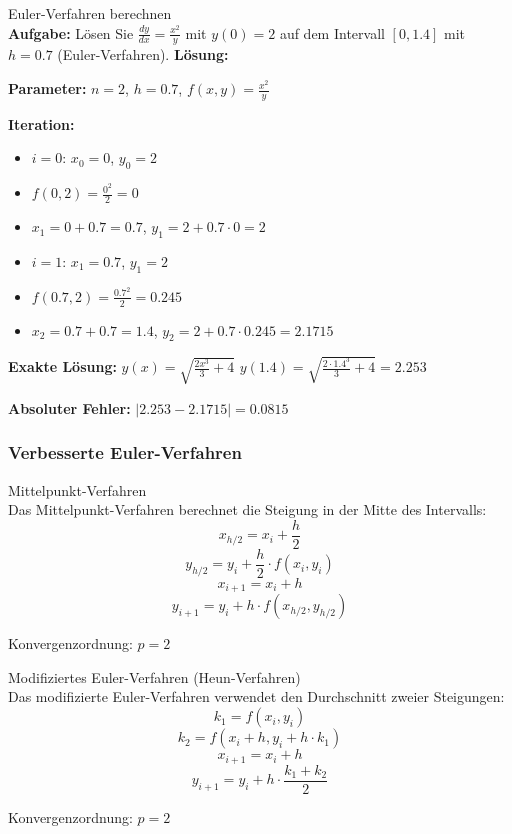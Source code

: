 \begin{example2}{Euler-Verfahren berechnen}\\
\textbf{Aufgabe:} Lösen Sie $\frac{dy}{dx} = \frac{x^2}{y}$ mit $y(0) = 2$ auf dem Intervall $[0, 1.4]$ mit $h = 0.7$ (Euler-Verfahren).
\tcblower
\textbf{Lösung:}

\textbf{Parameter:} $n = 2$, $h = 0.7$, $f(x,y) = \frac{x^2}{y}$

\textbf{Iteration:}
\begin{itemize}
    \item $i = 0$: $x_0 = 0$, $y_0 = 2$
    \item $f(0, 2) = \frac{0^2}{2} = 0$
    \item $x_1 = 0 + 0.7 = 0.7$, $y_1 = 2 + 0.7 \cdot 0 = 2$
\end{itemize}

\begin{itemize}
    \item $i = 1$: $x_1 = 0.7$, $y_1 = 2$
    \item $f(0.7, 2) = \frac{0.7^2}{2} = 0.245$
    \item $x_2 = 0.7 + 0.7 = 1.4$, $y_2 = 2 + 0.7 \cdot 0.245 = 2.1715$
\end{itemize}

\textbf{Exakte Lösung:} $y(x) = \sqrt{\frac{2x^3}{3} + 4}$
$y(1.4) = \sqrt{\frac{2 \cdot 1.4^3}{3} + 4} = 2.253$

\textbf{Absoluter Fehler:} $|2.253 - 2.1715| = 0.0815$
\end{example2}

\subsubsection{Verbesserte Euler-Verfahren}

\begin{theorem}{Mittelpunkt-Verfahren}\\
Das Mittelpunkt-Verfahren berechnet die Steigung in der Mitte des Intervalls:
$$x_{h/2} = x_i + \frac{h}{2}$$
$$y_{h/2} = y_i + \frac{h}{2} \cdot f(x_i, y_i)$$
$$x_{i+1} = x_i + h$$
$$y_{i+1} = y_i + h \cdot f(x_{h/2}, y_{h/2})$$

Konvergenzordnung: $p = 2$
\end{theorem}

\begin{corollary}{Modifiziertes Euler-Verfahren (Heun-Verfahren)}\\
Das modifizierte Euler-Verfahren verwendet den Durchschnitt zweier Steigungen:
$$k_1 = f(x_i, y_i)$$
$$k_2 = f(x_i + h, y_i + h \cdot k_1)$$
$$x_{i+1} = x_i + h$$
$$y_{i+1} = y_i + h \cdot \frac{k_1 + k_2}{2}$$

Konvergenzordnung: $p = 2$
\end{corollary}

